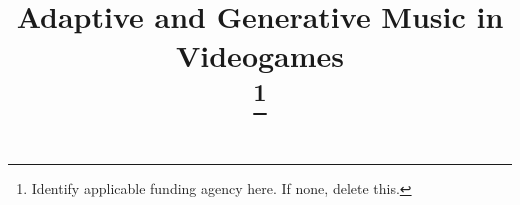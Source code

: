 \documentclass[conference]{IEEEtran}
\begin{document}
\title{Adaptive and Generative
Music in Videogames\\

{\footnotesize \textsuperscript{}}
\thanks{Identify applicable funding agency here. If none, delete this.}
}



\maketitle













\vspace{12pt}
\end{document}
